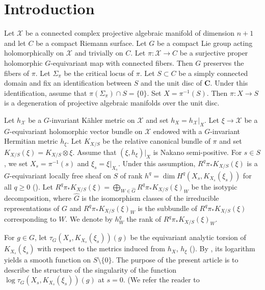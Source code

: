 \documentclass[amscd, leqno]{amsart}
\theoremstyle{plain}
\theoremstyle{definition}
\theoremstyle{remark}
\begin{document}
\section*{Introduction}
\label{sect:0}
\par
Let ${\mathcal X}$ be a connected complex projective algebraic manifold of dimension $n+1$ and let $C$ be a compact Riemann surface.
Let $G$ be a compact Lie group acting holomorphically on ${\mathcal X}$ and trivially on $C$.
Let $\pi\colon {\mathcal X} \to C$ be a surjective proper holomorphic $G$-equivariant map with connected fibers. 
Then $G$ preserves the fibers of $\pi$. Let $\Sigma_{\pi}$ be the critical locus of $\pi$. 
Let $S \subset C$ be a simply connected domain and fix an identification between $S$ and the unit disc of ${\mathbf C}$. 
Under this identification, assume that $\pi(\Sigma_{\pi}) \cap S=\{0\}$. 
Set $X = \pi^{-1}(S)$. Then $\pi\colon X \to S$ is a degeneration of projective algebraic manifolds over the unit disc. 
\par
Let $h_{\mathcal X}$ be a $G$-invariant K\"ahler metric on ${\mathcal X}$ and set $h_{X} = h_{\mathcal X}|_{X}$. 
Let $\xi \to {\mathcal X}$ be a $G$-equivariant holomorphic vector bundle on ${\mathcal X}$ endowed with a $G$-invariant 
Hermitian metric $h_{\xi}$. Let $K_{X/S}$ be the relative canonical bundle of $\pi$ and set $K_{X/S}(\xi) = K_{X/S}\otimes\xi$. 
Assume that $(\xi,h_{\xi})|_{X}$ is Nakano semi-positive. 
For $s\in S$, we set $X_{s} = \pi^{-1}(s)$ and $\xi_{s} = \xi|_{X_{s}}$.
Under this assumption, $R^{q}\pi_{*}K_{X/S}(\xi)$ is a $G$-equivariant locally free sheaf on $S$ 
of rank $h^{q}= \dim H^{q}(X_{s}, K_{X_{s}}(\xi_{s}))$ for all $q \geq0$ (\cite{Takegoshi95, MourouganeTakayama08}). 
Let $R^{q}\pi_{*}K_{X/S}(\xi) = \bigoplus_{W\in\widehat{G}} R^{q}\pi_{*}K_{X/S}(\xi)_{W}$
be the isotypic decomposition, where $\widehat{G}$ is the isomorphism classes of the irreducible representations of $G$ and 
$R^{q}\pi_{*}K_{X/S}(\xi)_{W}$ is the subbundle of $R^{q}\pi_{*}K_{X/S}(\xi)$ corresponding to $W$. We denote by $h_{W}^{q}$ the rank of
$R^{q}\pi_{*}K_{X/S}(\xi)_{W}$.
\par
For $g \in G$, let $\tau_{G}(X_{s},K_{X_{s}}(\xi_{s}))(g)$ be the equivariant analytic torsion of $K_{X_{s}}(\xi_{s})$
with respect to the metrics induced from $h_{X}$, $h_{\xi}$ (\cite{Bismut95}). By \cite{BGS88, Ma00}, its logarithm yields a smooth function 
on $S\setminus\{0\}$. The purpose of the present article is to describe the structure of the singularity of the function 
$\log \tau_{G}(X_{s},K_{X_{s}}(\xi_{s}))(g)$ at $s = 0$. (We refer the reader to 
\end{document}
